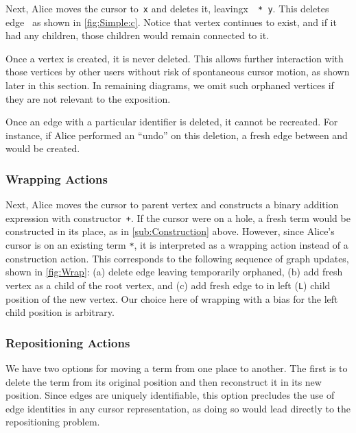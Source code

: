 
Next, Alice moves the cursor to~\texttt{x} and deletes it, leavingx~\texttt{\hole{} * y}.
This deletes edge~\eSimpleX{} as shown in \autoref{fig:Simple:c}.
Notice that vertex \vSimpleX{} continues to exist,
and if it had any children, those children would remain connected to it.

Once a vertex is created, it is never deleted.
This allows further interaction with those vertices by other users without risk of spontaneous cursor motion,
as shown later in this section.
In remaining diagrams, we omit such orphaned vertices if they are not relevant to the exposition.

Once an edge with a particular identifier is deleted, it cannot be recreated.
For instance, if Alice performed an ``undo'' on this deletion,
a fresh edge between \vSimpleTimes{} and \vSimpleX{} would be created.

\subsubsection{Wrapping Actions}%
\label{sub:Wrapping}

Next, Alice moves the cursor to parent vertex \vSimpleTimes{}
and constructs a binary addition expression with constructor~\texttt{+}.
If the cursor were on a hole,
a fresh term would be constructed in its place, as in \autoref{sub:Construction} above.
However, since Alice's cursor is on an existing term \texttt{*},
it is interpreted as a wrapping action instead of a construction action.
This corresponds to the following sequence of graph updates, shown in \autoref{fig:Wrap}:
(a) delete edge \eSimpleTimes{} leaving \vSimpleTimes{} temporarily orphaned,
(b) add fresh vertex \vWrapPlus{} as a child of the root vertex, and
(c) add fresh edge to \vSimpleTimes{} in left (\texttt{L}) child position of the new vertex.
Our choice here of wrapping with a bias for the left child position is arbitrary.

\subsubsection{Repositioning Actions}%
\label{sub:Repositioning}

We have two options for moving a term from one place to another.
The first is to delete the term from its original position and then reconstruct it in its new position.
Since edges are uniquely identifiable,
this option precludes the use of edge identities in any cursor representation,
as doing so would lead directly to the repositioning problem.


